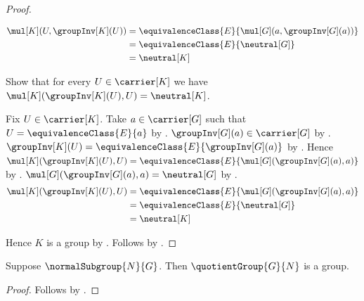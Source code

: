 \begin{proof}
\begin{subproof}
\begin{align*}
            \mul[K](U,\groupInv[K](U))
                &= \equivalenceClass
                    {E}{\mul[G](a,\groupInv[G](a))}
                \\
                &= \equivalenceClass{E}{\neutral[G]}
                \\
                &= \neutral[K]
        \end{align*}
    \end{subproof}
    Show that for every $U\in\carrier[K]$ we have
        $\mul[K](\groupInv[K](U),U)=\neutral[K]$.
    \begin{subproof}
        Fix $U\in\carrier[K]$.
        Take $a\in\carrier[G]$ such that
            $U=\equivalenceClass{E}{a}$ by
            .
        $\groupInv[G](a)\in\carrier[G]$ by
            .
        $\groupInv[K](U)=\equivalenceClass{E}{\groupInv[G](a)}$ by
            .
        Hence
            $\mul[K](\groupInv[K](U),U)=
                \equivalenceClass
                    {E}{\mul[G](\groupInv[G](a),a)}$ by
            .
        $\mul[G](\groupInv[G](a),a)=\neutral[G]$ by
            .
        \begin{align*}
            \mul[K](\groupInv[K](U),U)
                &= \equivalenceClass
                    {E}{\mul[G](\groupInv[G](a),a)}
                \\
                &= \equivalenceClass{E}{\neutral[G]}
                \\
                &= \neutral[K]
        \end{align*}
    \end{subproof}
    Hence $K$ is a group by
        .
    Follows by .
\end{proof}

\begin{corollary}\label{quotient_group_is_group}
    Suppose $\normalSubgroup{N}{G}$.
    Then $\quotientGroup{G}{N}$ is a group.
\end{corollary}
\begin{proof}
    Follows by .
\end{proof}

